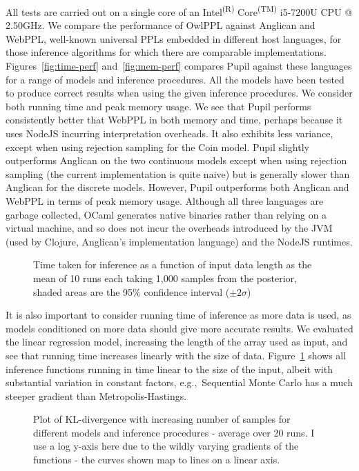 \documentclass[sigconf]{acmart}
\newcommand{\pupil}{Pupil\xspace}
\begin{document}
All tests are carried out on a single core of an Intel\textsuperscript{(R)} Core\textsuperscript{(TM)} i5-7200U CPU @ 2.50GHz. We compare the performance of OwlPPL against Anglican and WebPPL, well-known universal PPLs embedded in different host languages, for those inference algorithms for which there are comparable implementations. Figures~\ref{fig:time-perf} and~\ref{fig:mem-perf} compares \pupil against these languages for a range of models and inference procedures. All the models have been tested to produce correct results when using the given inference procedures. We consider both running time and peak memory usage. We see that \pupil performs consistently better that WebPPL in both memory and time, perhaps because it uses NodeJS incurring interpretation overheads. It also exhibits less variance, except when using rejection sampling for the Coin model. \pupil slightly outperforms Anglican on the two continuous models except when using rejection sampling (the current implementation is quite naive) but is generally slower than Anglican for the discrete models. However, \pupil outperforms both Anglican and WebPPL in terms of peak memory usage. Although all three languages are garbage collected, OCaml generates native binaries rather than relying on a virtual machine, and so does not incur the overheads introduced by the JVM (used by Clojure, Anglican's implementation language) and the NodeJS runtimes.

\begin{figure}
  \centering
  
  \caption{\label{fig:time-datasize}
    Time taken for inference as a function of input data length as the mean of 10 runs each taking 1,000 samples from the posterior, shaded areas are the 95\% confidence interval ($\pm 2\sigma$)}
\end{figure}

It is also important to consider running time of inference as more data is used, as  models conditioned on more data should  give more accurate results. We evaluated  the linear regression model, increasing the length of the array used as input, and see that running time increases linearly with the size of data. Figure~\ref{fig:time-datasize} shows all inference functions running in time linear to the size of the input, albeit with substantial variation in constant factors, e.g.,~Sequential Monte Carlo has a much steeper gradient than Metropolis-Hastings.

\begin{figure*}
  \centering
  
  \caption{\label{fig:kl}
    Plot of KL-divergence with increasing number of samples for different models and inference procedures - average over 20 runs. I use a log y-axis here due to the wildly varying gradients of the functions - the curves shown map to lines on a linear axis.}
\end{figure*}
\end{document}

